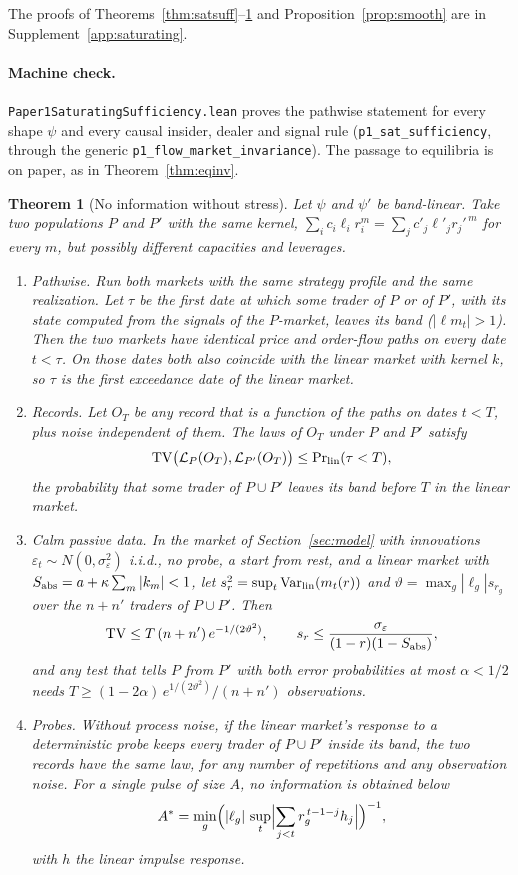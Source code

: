 \documentclass[12pt]{article}
\newtheorem{theorem}{Theorem}[section]
\theoremstyle{definition}
\theoremstyle{remark}
\begin{document}
The proofs of Theorems~\ref{thm:satsuff}--\ref{thm:stress} and Proposition~\ref{prop:smooth} are in Supplement~\ref{app:saturating}.

\paragraph{Machine check.} \nolinkurl{Paper1SaturatingSufficiency.lean} proves the pathwise statement for every shape $\psi$ and every causal insider, dealer and signal rule (\texttt{p1\_sat\_sufficiency}, through the generic \texttt{p1\_flow\_market\_invariance}). The passage to equilibria is on paper, as in Theorem~\ref{thm:eqinv}.

\begin{theorem}[No information without stress]\label{thm:stress}
Let $\psi$ and $\psi'$ be band-linear. Take two populations $P$ and $P'$ with the same kernel, $\sum_ic_i\ell_ir_i^m=\sum_jc'_j\ell'_jr_j'^{\,m}$ for every $m$, but possibly different capacities and leverages.
\begin{enumerate}[label=(\roman*),itemsep=1pt]
\item \emph{Pathwise.} Run both markets with the same strategy profile and the same realization. Let $\tau$ be the first date at which some trader of $P$ or of $P'$, with its state computed from the signals of the $P$-market, leaves its band ($|\ell m_t|>1$). Then the two markets have identical price and order-flow paths on every date $t<\tau$. On those dates both also coincide with the \emph{linear} market with kernel $k$, so $\tau$ is the first exceedance date of the linear market.
\item \emph{Records.} Let $O_T$ be any record that is a function of the paths on dates $t<T$, plus noise independent of them. The laws of $O_T$ under $P$ and $P'$ satisfy
\[
 \mathrm{TV}\bigl(\mathcal L_P(O_T),\mathcal L_{P'}(O_T)\bigr)\le\Pr\nolimits_{\rm lin}(\tau<T),
\]
the probability that some trader of $P\cup P'$ leaves its band before $T$ in the linear market.
\item \emph{Calm passive data.} In the market of Section~\ref{sec:model} with innovations $\varepsilon_t\sim N(0,\sigma_\varepsilon^2)$ i.i.d., no probe, a start from rest, and a linear market with $S_{\rm abs}=a+\kappa\sum_m|k_m|<1$, let $s_r^2=\sup_t\mathrm{Var}_{\rm lin}(m_t(r))$ and $\vartheta=\max_g|\ell_g|s_{r_g}$ over the $n+n'$ traders of $P\cup P'$. Then
\[
 \mathrm{TV}\le T\,(n+n')\,e^{-1/(2\vartheta^2)},\qquad s_r\le\frac{\sigma_\varepsilon}{(1-r)(1-S_{\rm abs})},
\]
and any test that tells $P$ from $P'$ with both error probabilities at most $\alpha<1/2$ needs $T\ge(1-2\alpha)\,e^{1/(2\vartheta^2)}/(n+n')$ observations.
\item \emph{Probes.} Without process noise, if the linear market's response to a deterministic probe keeps every trader of $P\cup P'$ inside its band, the two records have the same law, for any number of repetitions and any observation noise. For a single pulse of size $A$, no information is obtained below
\[
 A^*=\min_g\Bigl(|\ell_g|\,\sup_t\Bigl|\sum_{j<t}r_g^{\,t-1-j}h_j\Bigr|\Bigr)^{-1},
\]
with $h$ the linear impulse response.
\end{enumerate}
\end{theorem}
\end{document}
